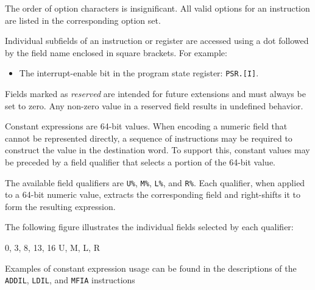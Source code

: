 The order of option characters is insignificant. All valid options for an instruction are listed in the corresponding option set.


Individual subfields of an instruction or register are accessed using a dot followed by the field name enclosed in square brackets. For example:

\begin{itemize}
    \setlength{\itemsep}{0.2em}
    \setlength{\topsep}{0pt}
    \setlength{\parskip}{0pt}
    \setlength{\parsep}{0pt}
    \item The interrupt-enable bit in the program state register: \texttt{PSR.[I]}.
\end{itemize}

Fields marked as \emph{reserved} are intended for future extensions and must always be set to zero. Any non-zero value in a reserved field results in undefined behavior.


Constant expressions are 64-bit values. When encoding a numeric field that cannot be represented directly, a sequence of instructions may be required to construct the value in the destination word. To support this, constant values may be preceded by a field qualifier that selects a portion of the 64-bit value.

The available field qualifiers are \texttt{U\%}, \texttt{M\%}, \texttt{L\%}, and \texttt{R\%}. Each qualifier, when applied to a 64-bit numeric value, extracts the corresponding field and right-shifts it to form the resulting expression.

The following figure illustrates the individual fields selected by each qualifier:

\begin{center}
    \drawInstrFormatSixtyFour
       {0, 3, 8, 13, 16}
        {U, M, L, R}
\end{center}

Examples of constant expression usage can be found in the descriptions of the \texttt{ADDIL}, \texttt{LDIL}, and \texttt{MFIA} instructions
